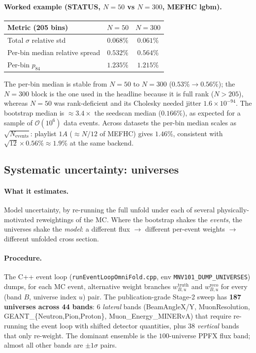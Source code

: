 \documentclass[12pt]{article}
\begin{document}
\paragraph{Worked example (STATUS, $N=50$ vs $N=300$, MEFHC lgbm).}
\begin{center}
\begin{tabular}{@{}lcc@{}}
\toprule
Metric (205 bins) & $N=50$ & $N=300$ \\
\midrule
Total $\sigma$ relative std & $0.068\%$ & $\boxed{0.061\%}$ \\
Per-bin median relative spread & $0.532\%$ & $\boxed{0.564\%}$ \\
Per-bin $p_{84}$ & $1.235\%$ & $1.215\%$ \\
\bottomrule
\end{tabular}
\end{center}
The per-bin median is stable from $N=50$ to $N=300$ ($0.53\%\to
0.56\%$); the $N=300$ block is the one used in the headline because it
is full rank ($N>205$), whereas $N=50$ was rank-deficient and its
Cholesky needed jitter $1.6\times 10^{-94}$. The bootstrap median is
$\approx 3.4\times$ the seedscan median ($0.166\%$), as expected for a
sample of $\mathcal{O}(10^{6})$ data events. Across datasets the
per-bin median scales as $\sqrt{N_{\text{events}}}$: playlist $1A$
($\approx N/12$ of MEFHC) gives $1.46\%$, consistent with
$\sqrt{12}\times 0.56\% \approx 1.9\%$ at the same backend.

\subsection{Systematic uncertainty: universes}
\label{sec:universes}

\paragraph{What it estimates.}
Model uncertainty, by re-running the full unfold under each of
several physically-motivated reweightings of the MC. Where the
bootstrap shakes the \emph{events}, the universes shake the
\emph{model}: a different flux $\to$ different per-event weights $\to$
different unfolded cross section.

\paragraph{Procedure.}
The C++ event loop (\texttt{runEventLoopOmniFold.cpp}, env
\texttt{MNV101\_DUMP\_UNIVERSES}) dumps, for each MC event,
alternative weight branches $w^{\text{truth}}_{B,u}$ and
$w^{\text{reco}}_{B,u}$ for every (band $B$, universe index $u$)
pair. The publication-grade Stage-2 sweep has \textbf{187 universes
across 44 bands}: $6$ \emph{lateral} bands (BeamAngleX/Y,
MuonResolution, GEANT\_\{Neutron,Pion,Proton\}, Muon\_Energy\_MINERvA)
that require re-running the event loop with shifted detector
quantities, plus $38$ \emph{vertical} bands that only re-weight. The
dominant ensemble is the $100$-universe PPFX flux band; almost all
other bands are $\pm1\sigma$ pairs.
\end{document}
